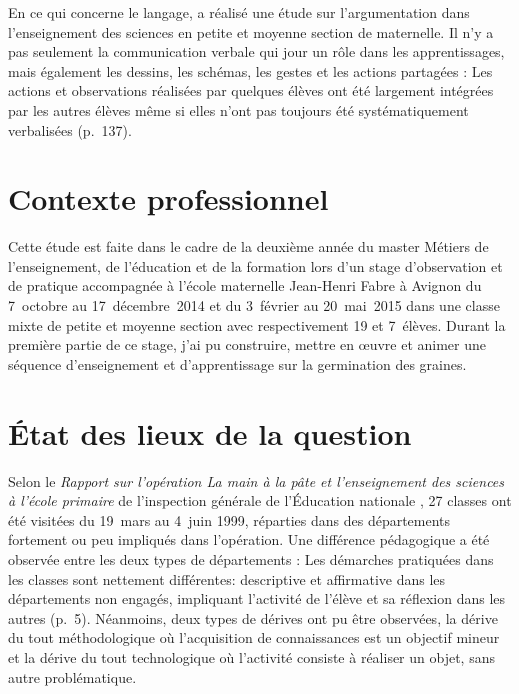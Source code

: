 En ce qui concerne le langage,  a réalisé une étude sur l’argumentation dans l’enseignement des sciences en petite et moyenne section de maternelle. Il n’y a pas seulement la communication verbale qui jour un rôle dans les apprentissages, mais également les dessins, les schémas, les gestes et les actions partagées : \og Les actions et observations réalisées par quelques élèves ont été largement intégrées par les autres élèves même si elles n’ont pas toujours été systématiquement verbalisées \fg{} (p.~137).


\section{Contexte professionnel}
Cette étude est faite dans le cadre de la deuxième année du master Métiers de l’enseignement, de l’éducation et de la formation lors d’un stage d’observation et de pratique accompagnée à l’école maternelle Jean-Henri Fabre à Avignon du 7~octobre au 17~décembre~2014 et du 3~février au 20~mai~2015 dans une classe mixte de petite et moyenne section avec respectivement 19 et 7~élèves. Durant la première partie de ce stage, j’ai pu construire, mettre en œuvre et animer une séquence d’enseignement et d’apprentissage sur la germination des graines. %


\section{État des lieux de la question}
Selon le \emph{Rapport sur l’opération \og La main à la pâte \fg{} et l’enseignement des sciences à l’école primaire} de l’inspection générale de l’Éducation nationale \cite{Sarmant1999}, 27 classes ont été visitées du 19~mars au 4~juin 1999, réparties dans des départements fortement ou peu impliqués dans l’opération. Une différence pédagogique a été observée entre les deux types de départements : \og Les démarches pratiquées dans les classes sont nettement différentes: descriptive et affirmative dans les départements non engagés, impliquant l’activité de l’élève et sa réflexion dans les autres \fg{} (p.~5). Néanmoins, deux types de dérives ont pu être observées, la dérive du \og tout méthodologique \fg{} où l’acquisition de connaissances est un objectif mineur et la dérive du \og tout technologique \fg{} où l’activité consiste à réaliser un objet, sans autre problématique.

